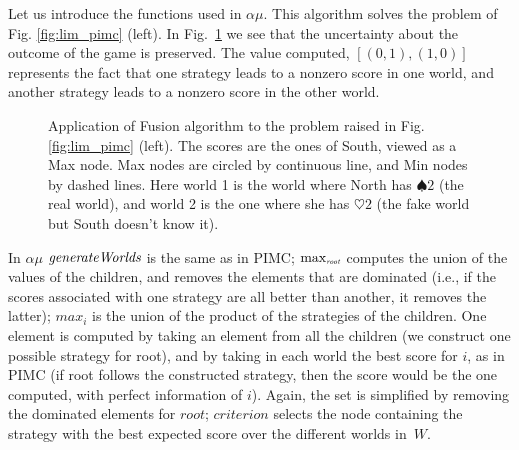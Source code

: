 \documentclass[runningheads]{llncs}
\begin{document}
Let us introduce the functions used in $\alpha\mu$. 
This algorithm solves the problem of Fig. \ref{fig:lim_pimc} (left). In 
Fig.~\ref{tree:am} we see that the uncertainty about the outcome of the game is preserved. The value computed, $[(0,1),(1,0)]$ represents the fact that one strategy leads to a nonzero score in one world, and another strategy leads to a nonzero score in the other world.
%
\begin{figure}[t]
    \caption{Application of Fusion algorithm to the problem raised in Fig. \ref{fig:lim_pimc} (left). The scores are the ones of South, viewed as a Max node. Max nodes are circled by continuous line, and Min nodes by dashed lines. Here world 1 is the world where North has $\spadesuit 2$ (the real world), and world 2 is the one where she has $\heartsuit 2$ (the fake world but South doesn't know it).}
    \label{tree:am}
    \hspace{-0.5cm}
\end{figure}

In $\alpha\mu$ $\mbox{\em generateWorlds}$ is the same as in PIMC; $\max_{\mbox{\em \tiny root}}$ computes the union of the values of the children, and removes the elements that are dominated (i.e., if the scores associated with one strategy are all better than another, it removes the latter); $max_i$ is the union of the product of the strategies of the children. One element is computed by taking an element from all the children (we construct one possible strategy for root), and by taking in each world the best score for $i$, as in PIMC (if root follows the constructed strategy, then the score would be the one computed, with perfect information of $i$). Again, the set is simplified by removing the dominated elements for $root$; $criterion$ selects the node containing the strategy with the best expected score over the different worlds in~$W$.
\end{document}
